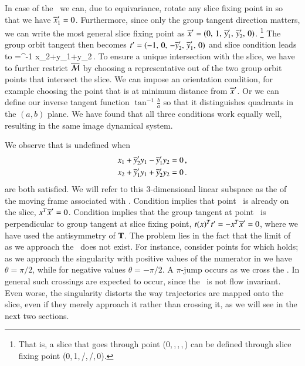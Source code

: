 \documentclass[preprint,number,sort&compress]{elsarticle}
\begin{document}
In case of the \cLe\ we can, due to equivariance, rotate any
slice fixing point in  so that we have
${\overline{x}'_{1}}=0$. Furthermore, since only the group
tangent direction matters, we can write the most general
slice fixing point as
${\overline{x}'}=(0,\,1,\,{\overline{y}'_{1}},\,{\overline{y}'_{2}},\,0)$.
    \footnote{
    That is, a slice that goes through point
    (0,\,,\,,\,,\,)
    can be defined through slice fixing point
    (0,\,1,\,/,\,/,\,0).}
The group orbit tangent then becomes
$t'_{}=(-1,\,0,\,-{\overline{y}'_{2}},\,{\overline{y}'_{1}},\,0)$
and slice condition  leads to
\beq
  \theta=\tan^{-1}
			  {x_2+y_1+y_2}\,.
To ensure a unique intersection with the slice, we have to further
restrict $\pSRed$ by choosing a representative out of the two group
orbit points that intersect the slice. We can impose an orientation
condition, for example
choosing the point that is at minimum distance from $\slicep$. Or we
can define our inverse tangent function $\tan^{-1}\frac{b}{a}$ so that
it distinguishes quadrants in the $(a,b)$ plane. We have found that
all three conditions work equally well, resulting in the same image
dynamical system.

We observe that  is undefined when
\begin{subequations}\label{cLeMFsing}
  \begin{align}
    x_1+\slicepComp{y}{2}y_1-\slicepComp{y}{1}y_2 &=0 \label{cLeMFsingOnSlice}\cont
    x_2+\slicepComp{y}{1}y_1+\slicepComp{y}{2}y_2 &=0 \label{cLeMFsingPerpTan}\,.
  \end{align}
\end{subequations}
are both satisfied. We will refer to this $3$-dimensional
linear subspace as the \emph{\sset} of the moving frame
associated with . Condition
 implies that point \ssp\ is already
on the slice, $x^T{\overline{x}'}=0$. Condition
 implies that the group tangent at
point \ssp\ is perpendicular to group tangent at slice fixing
point, $t{}(x)^Tt'_{}=-x^T{\overline{x}'}=0$,
where we have used the antisymmetry of $\mathbf{T}$. The problem lies
in the fact that the limit of  as we
approach the \sset\ does not exist. For instance, consider
points for which  holds; as we
approach the singularity with positive values of the
numerator in  we have $\theta=\pi/2$, while for
negative values $\theta=-\pi/2$. A $\pi$-jump occurs as we
cross the \sset. In general such crossings are expected to
occur, since the \sset\ is not flow invariant. Even worse,
the singularity distorts the way trajectories are mapped onto
the slice, even if they merely approach it rather than
crossing it, as we will see in the next two sections.
\end{document}
